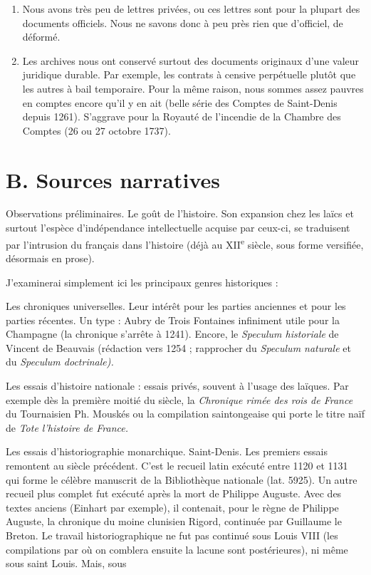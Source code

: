 \documentclass[french,twoside]{book} %
\newcommand{\labelchar}[1]{{\color{rubric}\bf #1}}
\begin{document}
\begin{enumerate}[itemsep=0pt,]
\item Nous avons très peu de lettres privées, ou ces lettres sont pour la plupart des documents officiels. Nous ne savons donc à peu près rien que d’officiel, de déformé.
\item Les archives nous ont conservé surtout des documents originaux d’une valeur juridique durable. Par exemple, les contrats à censive perpétuelle plutôt que les autres à bail temporaire. Pour la même raison, nous sommes assez pauvres en comptes encore qu’il y en ait (belle série des Comptes de Saint-Denis depuis 1261). S’aggrave pour la Royauté de l’incendie de la Chambre des Comptes (26 ou 27 octobre 1737).

\end{enumerate}\section[B. Sources narratives]{B. Sources narratives}
\label{c01b}
\noindent Observations préliminaires. Le goût de l’histoire. Son expansion chez les laïcs et surtout l’espèce d’indépendance intellectuelle acquise par ceux-ci, se traduisent par l’intrusion du français dans l’histoire (déjà au XII\textsuperscript{e} siècle, sous forme versifiée, désormais en prose).\par
J’examinerai simplement ici les principaux genres historiques :\par
\bigbreak
\noindent \labelchar{a)} Les chroniques universelles. Leur intérêt pour les parties anciennes et pour les parties récentes. Un type : Aubry de Trois Fontaines infiniment utile pour la Champagne (la chronique s’arrête à 1241). Encore, le {\itshape Speculum historiale} de Vincent de Beauvais (rédaction vers 1254 ; rapprocher du {\itshape Speculum naturale} et du {\itshape Speculum doctrinale).}\par
\bigbreak
\noindent \labelchar{b)} Les essais d’histoire nationale : essais privés, souvent à l’usage des laïques. Par exemple dès la première moitié du siècle, la {\itshape Chronique rimée des rois de France} du Tournaisien Ph. Mouskés ou la compilation saintongeaise qui porte le titre naïf de {\itshape Tote l’histoire de France.}\par
\bigbreak
\noindent \labelchar{c)} Les essais d’historiographie monarchique. Saint-Denis. Les premiers essais remontent au siècle précédent. C’est le recueil latin exécuté entre 1120 et 1131 qui forme le célèbre manuscrit de la Bibliothèque nationale (lat. 5925). Un autre recueil plus complet fut exécuté après la mort de Philippe Auguste. Avec des textes anciens (Einhart par exemple), il contenait, pour le règne de Philippe Auguste, la chronique du moine clunisien Rigord, continuée par Guillaume le Breton. Le travail historiographique ne fut pas continué sous Louis VIII (les compilations par où on comblera ensuite la lacune sont postérieures), ni même sous saint Louis. Mais, sous  
\end{document}
